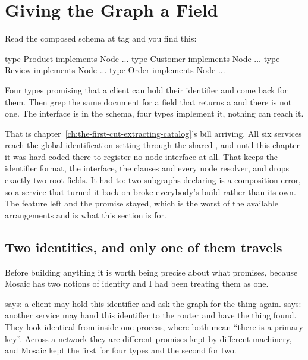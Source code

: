 \section{Giving the Graph a  Field}
\label{sec:ch13-giving-the-graph-a-node-field}
%

Read the composed schema at tag  and you find this:

\begin{graphqlsdl}[fontsize=\footnotesize]
type Product implements Node { ... }
type Customer implements Node { ... }
type Review implements Node { ... }
type Order implements Node { ... }
\end{graphqlsdl}

Four types promising that a client can hold their identifier and come back for
them. Then grep the same document for a field that returns a  and
there is not one. The interface is in the schema, four types implement it,
nothing can reach it.

%
That is chapter~\ref{ch:the-first-cut-extracting-catalog}'s bill arriving. All
six services reach the global identification setting through the shared
, and until this chapter it was hard-coded there to
register no node interface at all. That keeps the identifier format, the
interface, the  clauses and every node resolver, and drops
exactly two root fields. It had to: two subgraphs declaring  is
a composition error, so a service that turned it back on broke everybody's build
rather than its own. The feature left and the promise stayed, which is the worst
of the available arrangements and is what this section is for.

\subsection*{Two identities, and only one of them travels}

%
Before building anything it is worth being precise about what 
promises, because Mosaic has two notions of identity and I had been treating them
as one.

 says: a client may hold this identifier and ask the graph for the
thing again.  says: another service may hand this identifier to the
router and have the thing found. They look identical from inside one process,
where both mean \enquote{there is a primary key}. Across a network they are
different promises kept by different machinery, and Mosaic kept the first for
four types and the second for two.

